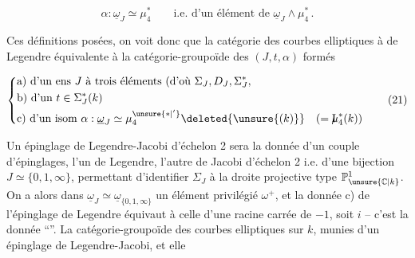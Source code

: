 \[
\alpha:\underline{\omega}_J\simeq\mu_4^*
\qquad\text{i.e. d'un élément de }\underline{\omega}_J\wedge\mu_4^*\,.
\tag*{(20)}
\]

Ces définitions posées, on voit donc que la catégorie des courbes elliptiques à  de Legendre   équivalente à la catégorie-groupoïde des   $(J,t,\alpha)$  formés

\[
\left\{\begin{aligned}
&\text{a) d'un ens }J\text{ à trois éléments (d'où }\Sigma_J,D_J,\Sigma_J^*,\\
&\text{b) d'un } t\in\Sigma_J^*(k)\\
&\text{c) d'un isom }\alpha:\underline{\omega}_J\simeq\mu_4^{\unsure{*|'}}\deleted{\unsure{(k)}}\quad(=\mathord{\mathrm{I}\mkern-7mu\mu}_4^*(k))
\end{aligned}\right.
\tag*{(21)}
\]

Un épinglage de Legendre-Jacobi d'échelon 2  sera la donnée d'un couple d'épinglages, l'un de Legendre, l'autre de Jacobi d'échelon 2 i.e. d'une bijection $J\simeq\{0,1,\infty\}$, permettant d'identifier $\Sigma_J$ à la droite projective type $\mathbb{P}^1_{\unsure{\mathbb{C}|k}}$. On a alors dans $\underline{\omega}_J\simeq\underline{\omega}_{\{0,1,\infty\}}$ un élément privilégié $\omega^+$, et la donnée c)  de l'épinglage de Legendre équivaut  à celle d'une racine carrée  de $-1$, soit $i$ -- c'est la donnée ``''.  La catégorie-groupoïde des courbes elliptiques sur $k$, munies d'un épinglage de Legendre-Jacobi,   et elle
